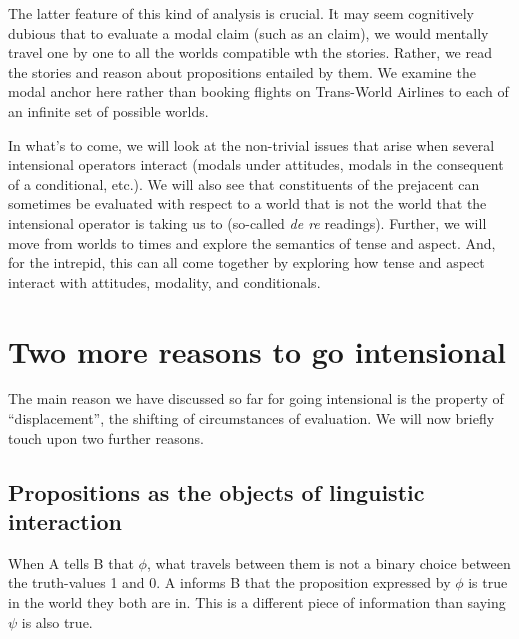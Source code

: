 %
The latter feature of this kind of analysis is crucial. It may seem cognitively
dubious that to evaluate a modal claim (such as an  claim), we would mentally travel one by one to all the worlds
compatible wth the stories. Rather, we read the stories and reason about
propositions entailed by them. %
%
We examine the modal anchor here rather than booking flights on Trans-World
Airlines to each of an infinite set of possible worlds.

In what's to come, we will look at the non-trivial issues that arise when
several intensional operators interact (modals under attitudes, modals in the
consequent of a conditional, etc.). We will also see that constituents of the
prejacent can sometimes be evaluated with respect to a world that is not the
world that the intensional operator is taking us to (so-called \emph{de re}
readings). Further, we will move from worlds to times and explore the semantics
of tense and aspect. And, for the intrepid, this can all come together by
exploring how tense and aspect interact with attitudes, modality, and
conditionals.

\section{Two more reasons to go intensional}
\label{sec:two-more-reasons}

The main reason we have discussed so far for going intensional is the property
of ``displacement'', the shifting of circumstances of evaluation. We will now
briefly touch upon two further reasons.

\subsection{Propositions as the objects of linguistic interaction}
\label{sec:linguistic-interaction}

When A tells B that \(\phi\), what travels between them is not a binary choice
between the truth-values 1 and 0. A informs B that the proposition expressed by
\(\phi\) is true in the world they both are in. This is a different piece of
information than saying \(\psi\) is also true.

